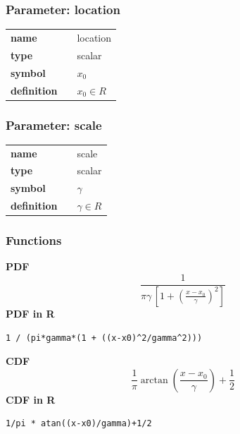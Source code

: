 \subsubsection*{Parameter: location}

\noindent\begin{tabular}{p{2cm}cl}
\textbf{name} & & location \\
\textbf{type} & & scalar \\
\textbf{symbol} & & $x_0$  \\
\textbf{definition} & & $x_0 \in  R$
\end{tabular}
\subsubsection*{Parameter: scale}

\noindent\begin{tabular}{p{2cm}cl}
\textbf{name} & & scale \\
\textbf{type} & & scalar \\
\textbf{symbol} & & $\gamma$  \\
\textbf{definition} & & $\gamma \in  R$
\end{tabular}
\subsubsection*{Functions}

\smallskip \noindent \hspace{.2cm} \textbf{PDF} 
\begin{equation*}\frac{1}{\pi\gamma\,\left[1 + \left(\frac{x-x_0}{\gamma}\right)^2\right]}\end{equation*}
\smallskip \noindent \hspace{.2cm} \textbf{PDF in R}  
\begin{verbatim}1 / (pi*gamma*(1 + ((x-x0)^2/gamma^2)))\end{verbatim}
\smallskip \noindent \hspace{.2cm} \textbf{CDF} 
\begin{equation*}\frac{1}{\pi} \arctan\left(\frac{x-x_0}{\gamma}\right)+\frac{1}{2}\end{equation*}
\smallskip \noindent \hspace{.2cm} \textbf{CDF in R} 
\begin{verbatim}1/pi * atan((x-x0)/gamma)+1/2\end{verbatim}
\smallskip
